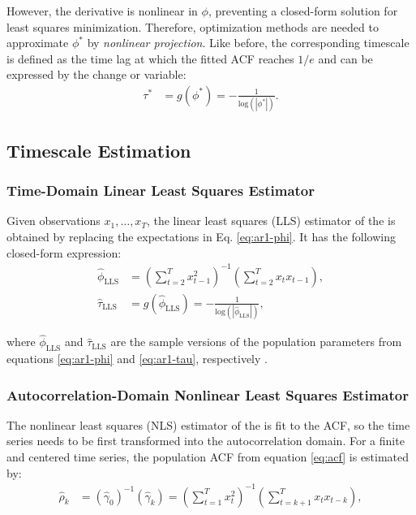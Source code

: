 \documentclass[docs/main.tex]{subfiles}
\begin{document}
\noindent However, the derivative is nonlinear in $\phi$, preventing a closed-form solution for least squares minimization. Therefore, optimization methods are needed to approximate $\phi^*$ by \textit{nonlinear projection}. Like before, the corresponding timescale is defined as the time lag at which the fitted ACF reaches $1/e$ and can be expressed by the change or variable:
\begin{align}
    \tau^* &= g(\phi^*) = -\frac{1}{\text{log}(|\phi^*|)}. \label{eq:nlm-tau}
\end{align}

\subsection{Timescale Estimation}\label{sec:timescale-estimation}
\subsubsection{Time-Domain Linear Least Squares Estimator}
Given observations $x_1, \ldots, x_T$, the linear least squares (LLS) estimator of the  is obtained by replacing the expectations in Eq. \eqref{eq:ar1-phi}. It has the following closed-form expression:
\begin{align}
    \hat\phi_{\scriptscriptstyle\text{LLS}} &= \left(\sum_{t=2}^T x_{t-1}^2\right)^{-1} \left(\sum_{t=2}^T x_t x_{t-1}\right),\\
    \hat\tau_{\scriptscriptstyle\text{LLS}} &= g(\hat\phi_{\scriptscriptstyle\text{LLS}}) = -\frac{1}{\text{log}(|\hat\phi_{\scriptscriptstyle\text{LLS}}|)},
\end{align}

\noindent where $\hat\phi_{\scriptscriptstyle\text{LLS}}$ and $\hat\tau_{\scriptscriptstyle\text{LLS}}$ are the sample versions of the population parameters from equations \eqref{eq:ar1-phi} and \eqref{eq:ar1-tau}, respectively \citep[Chapter~14.3]{hansen_econometrics_2022}.\\


\subsubsection{Autocorrelation-Domain Nonlinear Least Squares Estimator}
The nonlinear least squares (NLS) estimator of the  is fit to the ACF, so the time series needs to be first transformed into the autocorrelation domain. For a finite and centered time series, the population ACF from equation \eqref{eq:acf} is estimated by:
\begin{align}\label{eq:acf_}
    \hat\rho_k &= (\hat\gamma_0)^{-1}(\hat\gamma_k) = \left(\sum_{t=1}^T x_t^2\right)^{-1} \left(\sum_{t=k+1}^{T}x_t x_{t-k}\right),
\end{align}
\end{document}
